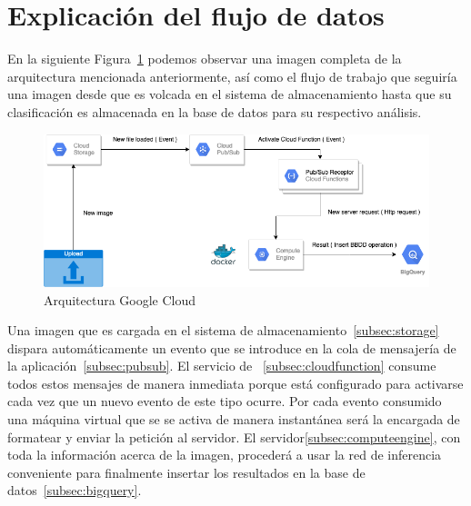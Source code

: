 \section{Explicación del flujo de datos}\label{subsec:explicación-del-flujo-de-la-arquitectura}
En la siguiente Figura~\ref{fig:Arquitectura Google Cloud} podemos observar una imagen completa de la arquitectura mencionada anteriormente, así como el flujo de trabajo que seguiría una imagen desde que es volcada en el sistema de almacenamiento hasta que su clasificación es almacenada en la base de datos para su respectivo análisis.
\begin{figure}
    \centering
    \includegraphics[width=1.0\textwidth]{images/chapter4/google_cloud_architecture.png}
    \caption{Arquitectura Google Cloud}
    \label{fig:Arquitectura Google Cloud}
\end{figure}
Una imagen que es cargada en el sistema de almacenamiento~\ref{subsec:storage} dispara automáticamente un evento que se introduce en la cola de mensajería de la aplicación~\ref{subsec:pubsub}.
El servicio de ~\ref{subsec:cloudfunction} consume todos estos mensajes de manera inmediata porque está configurado para activarse cada vez que un nuevo evento de este tipo ocurre.
Por cada evento consumido una máquina virtual que se se activa de manera instantánea será la encargada de formatear y enviar la petición al servidor.
El servidor\ref{subsec:computeengine}, con toda la información acerca de la imagen, procederá a usar la red de inferencia conveniente para finalmente insertar los resultados en la base de datos~\ref{subsec:bigquery}.

